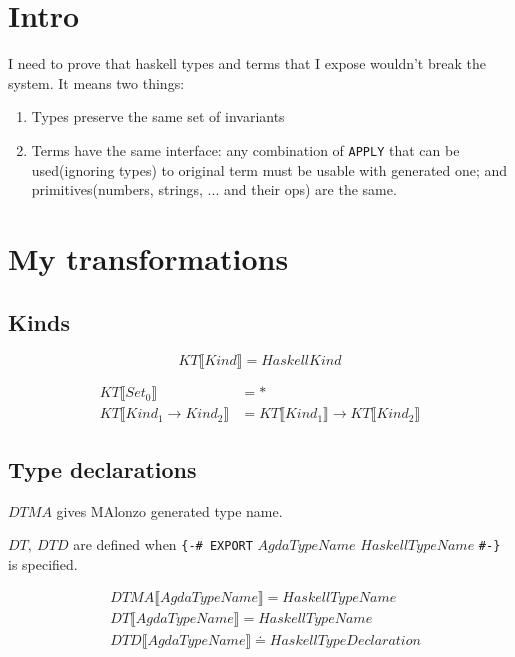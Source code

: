 \section{Intro}

I need to prove that haskell types and terms that I expose wouldn't break the system.  It means two things:
\begin{enumerate}
\item Types preserve the same set of invariants
\item Terms have the same interface: any combination of \texttt{APPLY} that can be used(ignoring types) to original
      term must be usable with generated one; and primitives(numbers, strings, ... and their ops) are the same.
\end{enumerate}

\section{My transformations}

\subsection{Kinds}
\[ KT\llbracket Kind \rrbracket = HaskellKind \]

\begin{align*}
   KT\llbracket Set_0 \rrbracket &= *\\
   KT\llbracket Kind_1 \rightarrow Kind_2 \rrbracket &=
      KT\llbracket Kind_1 \rrbracket \rightarrow KT\llbracket Kind_2 \rrbracket
\end{align*}

\subsection{Type declarations}

\(DTMA\) gives MAlonzo generated type name.

\(DT,\ DTD\) are defined when \texttt{\{-\# EXPORT} \(AgdaTypeName\) \(HaskellTypeName\) \texttt{\#-\}} is specified.

\begin{align*}
   &DTMA\llbracket AgdaTypeName \rrbracket = HaskellTypeName\\
   &DT\llbracket AgdaTypeName \rrbracket = HaskellTypeName\\
   &DTD\llbracket AgdaTypeName \rrbracket \doteq HaskellTypeDeclaration\\
\end{align*}

